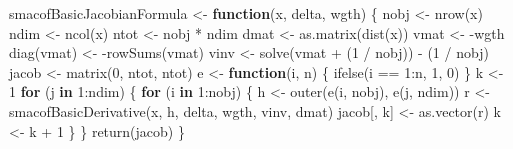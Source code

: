 \documentclass[
  12pt,
  letterpaper,
  DIV=11,
  numbers=noendperiod]{scrartcl}
\newenvironment{Shaded}{\begin{snugshade}}{\end{snugshade}}
\newcommand{\ControlFlowTok}[1]{\textcolor[rgb]{0.00,0.23,0.31}{\textbf{#1}}}
\newcommand{\DecValTok}[1]{\textcolor[rgb]{0.68,0.00,0.00}{#1}}
\newcommand{\FunctionTok}[1]{\textcolor[rgb]{0.28,0.35,0.67}{#1}}
\newcommand{\NormalTok}[1]{\textcolor[rgb]{0.00,0.23,0.31}{#1}}
\newcommand{\OtherTok}[1]{\textcolor[rgb]{0.00,0.23,0.31}{#1}}
\newcommand{\SpecialCharTok}[1]{\textcolor[rgb]{0.37,0.37,0.37}{#1}}
\begin{document}
\begin{Shaded}
\begin{Highlighting}[]
\NormalTok{smacofBasicJacobianFormula }\OtherTok{\textless{}{-}} \ControlFlowTok{function}\NormalTok{(x, delta, wgth) \{}
\NormalTok{  nobj }\OtherTok{\textless{}{-}} \FunctionTok{nrow}\NormalTok{(x)}
\NormalTok{  ndim }\OtherTok{\textless{}{-}} \FunctionTok{ncol}\NormalTok{(x)}
\NormalTok{  ntot }\OtherTok{\textless{}{-}}\NormalTok{ nobj }\SpecialCharTok{*}\NormalTok{ ndim}
\NormalTok{  dmat }\OtherTok{\textless{}{-}} \FunctionTok{as.matrix}\NormalTok{(}\FunctionTok{dist}\NormalTok{(x))}
\NormalTok{  vmat }\OtherTok{\textless{}{-}} \SpecialCharTok{{-}}\NormalTok{wgth}
  \FunctionTok{diag}\NormalTok{(vmat) }\OtherTok{\textless{}{-}} \SpecialCharTok{{-}}\FunctionTok{rowSums}\NormalTok{(vmat)}
\NormalTok{  vinv }\OtherTok{\textless{}{-}} \FunctionTok{solve}\NormalTok{(vmat }\SpecialCharTok{+}\NormalTok{ (}\DecValTok{1} \SpecialCharTok{/}\NormalTok{ nobj)) }\SpecialCharTok{{-}}\NormalTok{ (}\DecValTok{1} \SpecialCharTok{/}\NormalTok{ nobj)}
\NormalTok{  jacob }\OtherTok{\textless{}{-}} \FunctionTok{matrix}\NormalTok{(}\DecValTok{0}\NormalTok{, ntot, ntot)}
\NormalTok{  e }\OtherTok{\textless{}{-}} \ControlFlowTok{function}\NormalTok{(i, n) \{}
    \FunctionTok{ifelse}\NormalTok{(i }\SpecialCharTok{==} \DecValTok{1}\SpecialCharTok{:}\NormalTok{n, }\DecValTok{1}\NormalTok{, }\DecValTok{0}\NormalTok{)}
\NormalTok{  \}}
\NormalTok{  k }\OtherTok{\textless{}{-}} \DecValTok{1}
  \ControlFlowTok{for}\NormalTok{ (j }\ControlFlowTok{in} \DecValTok{1}\SpecialCharTok{:}\NormalTok{ndim) \{}
    \ControlFlowTok{for}\NormalTok{ (i }\ControlFlowTok{in} \DecValTok{1}\SpecialCharTok{:}\NormalTok{nobj) \{}
\NormalTok{      h }\OtherTok{\textless{}{-}} \FunctionTok{outer}\NormalTok{(}\FunctionTok{e}\NormalTok{(i, nobj), }\FunctionTok{e}\NormalTok{(j, ndim))}
\NormalTok{      r }\OtherTok{\textless{}{-}} \FunctionTok{smacofBasicDerivative}\NormalTok{(x, h, delta, wgth, vinv, dmat)}
\NormalTok{      jacob[, k] }\OtherTok{\textless{}{-}} \FunctionTok{as.vector}\NormalTok{(r)}
\NormalTok{      k }\OtherTok{\textless{}{-}}\NormalTok{ k }\SpecialCharTok{+} \DecValTok{1}
\NormalTok{    \}}
\NormalTok{  \}}
  \FunctionTok{return}\NormalTok{(jacob)}
\NormalTok{\}}


\end{Highlighting}
\end{Shaded}
\end{document}
